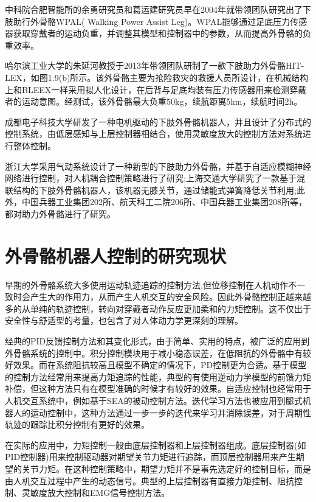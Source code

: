 中科院合肥智能所的余勇研究员和葛运建研究员早在2004年就带领团队研究出了下肢助行外骨骼WPAL\cite{p14}( Walking Power Assist Leg)。WPAL能够通过足底压力传感器获取穿戴者的运动负重，并调整其模型和控制器中的参数，从而提高外骨骼的负重效率\cite{p15}。

哈尔滨工业大学的朱延河教授于2013年带领团队研制了一款下肢助力外骨骼HIT-LEX\cite{p18}，如图1.9(b)所示。该外骨骼主要为抢险救灾的救援人员所设计，在机械结构上和BLEEX一样采用拟人化设计，在后背与足底均装有压力传感器用来检测穿戴者的运动意图。经测试，该外骨骼最大负重50kg，续航距离5km，续航时间2h。

成都电子科技大学研发了一种电机驱动的下肢外骨骼机器人，并且设计了分布式的控制系统，由低层感知与上层控制器相结合，使用灵敏度放大的控制方法对系统进行整体控制\cite{p19}。

浙江大学采用气动系统设计了一种新型的下肢助力外骨骼，并基于自适应模糊神经网络进行控制，对人机耦合控制策略进行了研究\cite{p17};上海交通大学研究了一款基于混联结构的下肢外骨骼机器人，该机器无膝关节，通过储能式弹簧降低关节利用\cite{p20};此外，中国兵器工业集团202所、航天科工二院206所、中国兵器工业集团208所等，都对助力外骨骼进行了研究。

\section{外骨骼机器人控制的研究现状}

早期的外骨骼系统大多使用运动轨迹追踪的控制方法\cite{p21,p22},但位移控制在人机动作不一致时会产生大的作用力，从而产生人机交互的安全风险。因此外骨骼控制正越来越多的从单纯的轨迹控制，转向对穿戴者动作反应更加柔和的力矩控制。这不仅出于安全性与舒适型的考量，也包含了对人体动力学更深刻的理解\cite{p23,p24}。

经典的PID反馈控制方法和其变化形式，由于简单、实用的特点，被广泛的应用到外骨骼系统的控制中。积分控制模块用于减小稳态误差，在低阻抗的外骨骼中有较好效果\cite{p25}。而在系统阻抗较高且模型不确定的情况下，PD控制更为合适\cite{p27,p28}。基于模型的控制方法经常用来提高力矩追踪的性能，典型的有使用逆动力学模型的前馈力矩补偿\cite{p7,p22,p29}，但这种方法只有在模型准确的时候才有较好的效果。自适应控制也经常用于人机交互系统中，例如基于SEA的被动控制方法\cite{p30}。迭代学习方法也被应用到腿式机器人的运动控制中\cite{p31}，这种方法通过一步一步的迭代来学习并消除误差，对于周期性轨迹的跟踪比积分控制有更好的效果。

在实际的应用中，力矩控制一般由底层控制器和上层控制器组成。底层控制器(如PID控制器)用来控制驱动器对期望关节力矩进行追踪，而顶层控制器用来产生期望的关节力矩。在这种控制策略中，期望力矩并不是事先选定好的控制目标，而是由人机交互过程中产生的动态信号。典型的上层控制器有直接力矩控制、阻抗控制、灵敏度放大控制和EMG信号控制方法。


